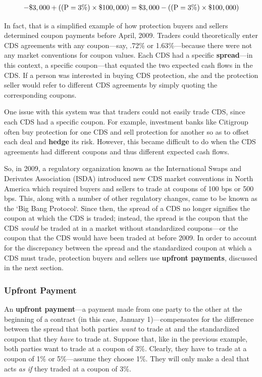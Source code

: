 \documentclass{jss}
\begin{document}
\begin{equation}
 \begin{aligned}
   {\rm - \$3,000 + ((P = 3\%) \times \$100,000) = \$3,000 - ((P = 3\%) \times \$100,000)}
    \end{aligned}
\end{equation}

In fact, that is a simplified example of how protection buyers and sellers determined coupon payments before April, 2009. Traders could theoretically enter CDS agreements with any coupon---say, .72\% or 1.63\%---because there were not any market conventions for coupon values. Each CDS had a specific \textbf{spread}---in this context, a specific coupon---that equated the two expected cash flows in the CDS. If a person was interested in buying CDS protection, she and the protection seller would refer to different CDS agreements by simply quoting the corresponding coupons.

One issue with this system was that traders could not easily trade CDS, since each CDS had a specific coupon.
For example, investment banks like Citigroup often buy protection for one CDS and sell protection for another so as to offset each deal and \textbf{hedge} its risk. However, this became difficult to do when the CDS agreements had different coupons and thus different expected cash flows.

So, in 2009, a regulatory organization known as the International Swaps and Derivates Association (ISDA) 
introduced new CDS market conventions in North America which required buyers and sellers to trade at coupons of 100 bps or 500 bps. This, along with a number of other regulatory changes, came to be known as the `Big Bang Protocol`. Since then, the spread of a CDS no longer signifies the coupon at which the CDS is traded; instead, the spread is the coupon that the CDS \emph{would} be traded at in a market without standardized coupons---or the coupon that the CDS would have been traded at before 2009. In order to account for the discrepancy between the spread and the standardized coupon at which a CDS must trade, protection buyers and sellers use \textbf{upfront payments}, discussed in the next section.

\subsubsection{Upfront Payment}
\label{sec:Upfront}

An \textbf{upfront payment}---a payment made from one party to the other at the beginning of a contract (in this case, January 1)---compensates for the difference between the spread that both parties \emph{want} to trade at and the standardized coupon that they \emph{have} to trade at. Suppose that, like in the previous example, both parties want to trade at a coupon of 3\%. Clearly, they have to trade at a coupon of 1\% or 5\%---assume they choose 1\%. They will only make a deal that acts \emph{as if} they traded at a coupon of 3\%. 
\end{document}
